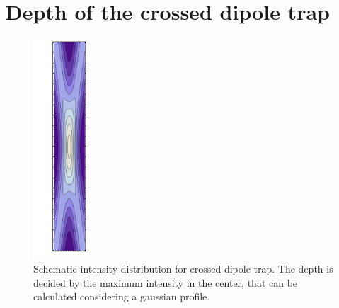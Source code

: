 \section{Depth of the crossed dipole trap}
\begin{figure}[H]
\centering
 \includegraphics[width=0.2\textwidth,angle=90]{crossed_dipole_trap}

\caption{Schematic intensity distribution for crossed dipole trap. The depth is decided by the maximum intensity in the center, that can be calculated considering a gaussian profile.}
\label{dipolegraphic}
\end{figure}

